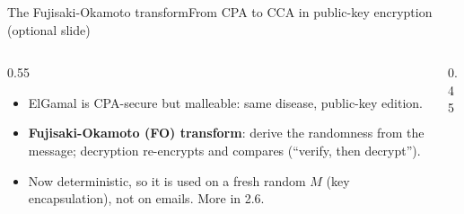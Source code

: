 \ifdefined\PRESENTATION\else\PassOptionsToClass{handout}{beamer}\fi\documentclass[aspectratio=169, lualatex]{beamer}
\begin{document}
\begin{frame}{The Fujisaki-Okamoto transform}{From CPA to CCA in public-key encryption (optional slide)}
	\begin{columns}[c]
		\begin{column}{0.55\textwidth}
			\begin{itemize}
				\item ElGamal is CPA-secure but malleable: same disease, public-key edition.
				\item \textbf{Fujisaki-Okamoto (FO) transform}: derive the randomness from the message; decryption re-encrypts and compares (``verify, then decrypt'').
				\item Now deterministic, so it is used on a fresh random $M$ (key encapsulation), not on emails. More in 2.6.
			\end{itemize}
		\end{column}
		\begin{column}{0.45\textwidth}
		\end{column}
	\end{columns}
\end{frame}

\begin{frame}[plain]
	\titlepage
\end{frame}
\end{document}
